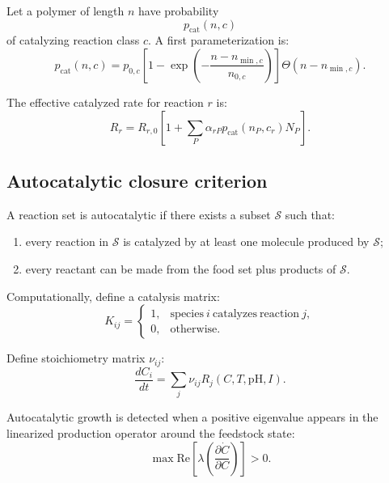 \documentclass[11pt]{article}
\begin{document}
Let a polymer of length $n$ have probability
\begin{equation}
    p_{\mathrm{cat}}(n,c)
\end{equation}
of catalyzing reaction class $c$. A first parameterization is:
\begin{equation}
    p_{\mathrm{cat}}(n,c)
    =
    p_{0,c}
    \left[
    1-\exp\left(-\frac{n-n_{\min,c}}{n_{0,c}}\right)
    \right]
    \Theta(n-n_{\min,c}).
\end{equation}

The effective catalyzed rate for reaction $r$ is:
\begin{equation}
    R_r =
    R_{r,0}
    \left[
    1 +
    \sum_P
    \alpha_{rP}
    p_{\mathrm{cat}}(n_P,c_r)
    N_P
    \right].
\end{equation}

\subsection{Autocatalytic closure criterion}

A reaction set is autocatalytic if there exists a subset $\mathcal{S}$ such
that:
\begin{enumerate}
    \item every reaction in $\mathcal{S}$ is catalyzed by at least one molecule
    produced by $\mathcal{S}$;
    \item every reactant can be made from the food set plus products of
    $\mathcal{S}$.
\end{enumerate}

Computationally, define a catalysis matrix:
\begin{equation}
    K_{ij} =
    \begin{cases}
    1, & \mathrm{species\ } i \mathrm{\ catalyzes\ reaction\ } j, \\
    0, & \mathrm{otherwise}.
    \end{cases}
\end{equation}

Define stoichiometry matrix $\nu_{ij}$:
\begin{equation}
    \frac{dC_i}{dt}
    =
    \sum_j \nu_{ij} R_j(C,T,\mathrm{pH},I).
\end{equation}

Autocatalytic growth is detected when a positive eigenvalue appears in the
linearized production operator around the feedstock state:
\begin{equation}
    \max \mathrm{Re}\left[\lambda
    \left(
    \frac{\partial \dot{C}}{\partial C}
    \right)\right] > 0.
\end{equation}
\end{document}
